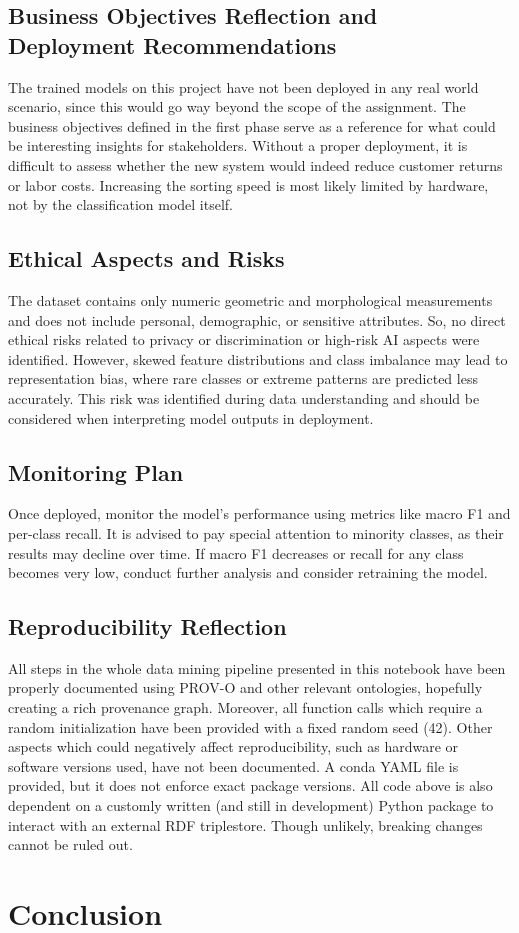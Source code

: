 \documentclass[sigconf]{acmart}
\begin{document}
\subsection{Business Objectives Reflection and Deployment Recommendations}
The trained models on this project have not been deployed in any real world scenario, since this would go way beyond the scope of the assignment. The business objectives defined in the first phase serve as a reference for what could be interesting insights for stakeholders. Without a proper deployment, it is difficult to assess whether the new system would indeed reduce customer returns or labor costs. Increasing the sorting speed is most likely limited by hardware, not by the classification model itself.
\subsection{Ethical Aspects and Risks}
The dataset contains only numeric geometric and morphological measurements and does not include personal, demographic, or sensitive attributes. So, no direct ethical risks related to privacy or discrimination or  high-risk AI aspects were identified. However, skewed feature distributions and class imbalance may lead to representation bias, where rare classes or extreme patterns are predicted less accurately. This risk was identified during data understanding and should be considered when interpreting model outputs in deployment.
\subsection{Monitoring Plan}
Once deployed, monitor the model's performance using metrics like macro F1 and per-class recall. It is advised to pay special attention to minority classes, as their results may decline over time. If macro F1 decreases or recall for any class becomes very low, conduct further analysis and consider retraining the model.
\subsection{Reproducibility Reflection}
All steps in the whole data mining pipeline presented in this notebook have been properly documented using PROV-O and other relevant ontologies, hopefully creating a rich provenance graph. Moreover, all function calls which require a random initialization have been provided with a fixed random seed (42). Other aspects which could negatively affect reproducibility, such as hardware or software versions used, have not been documented. A conda YAML file is provided, but it does not enforce exact package versions. All code above is also dependent on a customly written (and still in development) Python package to interact with an external RDF triplestore. Though unlikely, breaking changes cannot be ruled out.

\section{Conclusion}
\end{document}

